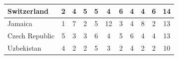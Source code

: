 \documentclass[12pt]{article}  %
\begin{document}
\begin{subappendices}
\begin{longtable}{|l|c|c|c|c|c|c|c|c|c|c|}
	\hline
	Switzerland                                                    & 2                                                                      & 4                                                                      & 5                                                                      & 5                                                                      & 4                                                                      & 6                                                                      & 4                         & 4                           & 6                           & 14                          \\ 
	\hline
	Jamaica                                                        & 1                                                                      & 7                                                                      & 2                                                                      & 5                                                                      & 12                                                                     & 3                                                                      & 4                         & 8                           & 2                           & 13                          \\ 
	\hline
	Czech Republic                                                 & 5                                                                      & 3                                                                      & 3                                                                      & 6                                                                      & 4                                                                      & 5                                                                      & 6                         & 4                           & 4                           & 13                          \\ 
	\hline
	Uzbekistan                                                     & 4                                                                      & 2                                                                      & 2                                                                      & 5                                                                      & 3                                                                      & 2                                                                      & 4                         & 2                           & 2                           & 10                          \\ 

\end{longtable}
\end{subappendices}
\end{document}
